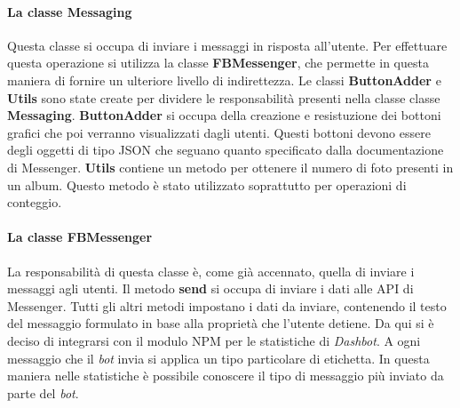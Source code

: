 \paragraph*{La classe Messaging} Questa classe si occupa di inviare i messaggi
in risposta all'utente. Per effettuare questa operazione si utilizza la classe
\textbf{FBMessenger}, che permette in questa maniera di fornire un ulteriore
livello di indirettezza. Le classi \textbf{ButtonAdder} e \textbf{Utils} sono
state create per dividere le responsabilità presenti nella classe classe
\textbf{Messaging}. \textbf{ButtonAdder} si occupa della creazione e
resistuzione dei bottoni grafici che poi verranno visualizzati dagli utenti.
Questi bottoni devono essere degli oggetti di tipo JSON che seguano quanto
specificato dalla documentazione di Messenger.
\textbf{Utils} contiene un metodo per ottenere il numero di foto presenti in un
album. Questo metodo è stato utilizzato soprattutto per operazioni di conteggio.

\paragraph*{La classe FBMessenger} La responsabilità di questa classe è, come
già accennato, quella di inviare i messaggi agli utenti. Il metodo
\textbf{send} si occupa di inviare i dati alle API di Messenger. Tutti gli
altri metodi impostano i dati da inviare, contenendo il testo del messaggio
formulato in base alla proprietà che l'utente detiene. Da qui si è deciso di
integrarsi con il modulo NPM per le statistiche di \textit{Dashbot}. A ogni
messaggio che il \textit{bot} invia si applica un tipo particolare di
etichetta. In questa maniera nelle statistiche è possibile conoscere il tipo di
messaggio più inviato da parte del \textit{bot}.
